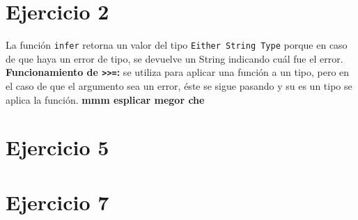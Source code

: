 \documentclass[11pt, fleqn]{article}
\begin{document}

\section*{Ejercicio 2}

La función \texttt{infer} retorna un valor del tipo \texttt{Either String Type}
porque en caso de que haya un error de tipo, se devuelve un String indicando
cuál fue el error. \\

\textbf{Funcionamiento de \texttt{>>=}:} se utiliza para aplicar una función
a un tipo, pero en el caso de que el argumento sea un error, éste se sigue pasando
y su es un tipo se aplica la función. \textbf{mmm esplicar megor che}


\section*{Ejercicio 5}


\section*{Ejercicio 7}


\begin{prooftree}


\end{prooftree}

\begin{prooftree}


\end{prooftree}
\end{document}
